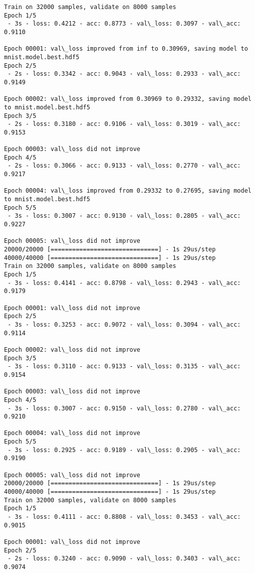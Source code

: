 \documentclass[11pt]{article}
\begin{document}
    \begin{Verbatim}[commandchars=\\\{\}]
Train on 32000 samples, validate on 8000 samples
Epoch 1/5
 - 3s - loss: 0.4212 - acc: 0.8773 - val\_loss: 0.3097 - val\_acc: 0.9110

Epoch 00001: val\_loss improved from inf to 0.30969, saving model to mnist.model.best.hdf5
Epoch 2/5
 - 2s - loss: 0.3342 - acc: 0.9043 - val\_loss: 0.2933 - val\_acc: 0.9149

Epoch 00002: val\_loss improved from 0.30969 to 0.29332, saving model to mnist.model.best.hdf5
Epoch 3/5
 - 2s - loss: 0.3180 - acc: 0.9106 - val\_loss: 0.3019 - val\_acc: 0.9153

Epoch 00003: val\_loss did not improve
Epoch 4/5
 - 2s - loss: 0.3066 - acc: 0.9133 - val\_loss: 0.2770 - val\_acc: 0.9217

Epoch 00004: val\_loss improved from 0.29332 to 0.27695, saving model to mnist.model.best.hdf5
Epoch 5/5
 - 3s - loss: 0.3007 - acc: 0.9130 - val\_loss: 0.2805 - val\_acc: 0.9227

Epoch 00005: val\_loss did not improve
20000/20000 [==============================] - 1s 29us/step
40000/40000 [==============================] - 1s 29us/step
Train on 32000 samples, validate on 8000 samples
Epoch 1/5
 - 3s - loss: 0.4141 - acc: 0.8798 - val\_loss: 0.2943 - val\_acc: 0.9179

Epoch 00001: val\_loss did not improve
Epoch 2/5
 - 3s - loss: 0.3253 - acc: 0.9072 - val\_loss: 0.3094 - val\_acc: 0.9114

Epoch 00002: val\_loss did not improve
Epoch 3/5
 - 3s - loss: 0.3110 - acc: 0.9133 - val\_loss: 0.3135 - val\_acc: 0.9154

Epoch 00003: val\_loss did not improve
Epoch 4/5
 - 3s - loss: 0.3007 - acc: 0.9150 - val\_loss: 0.2780 - val\_acc: 0.9210

Epoch 00004: val\_loss did not improve
Epoch 5/5
 - 3s - loss: 0.2925 - acc: 0.9189 - val\_loss: 0.2905 - val\_acc: 0.9190

Epoch 00005: val\_loss did not improve
20000/20000 [==============================] - 1s 29us/step
40000/40000 [==============================] - 1s 29us/step
Train on 32000 samples, validate on 8000 samples
Epoch 1/5
 - 3s - loss: 0.4111 - acc: 0.8808 - val\_loss: 0.3453 - val\_acc: 0.9015

Epoch 00001: val\_loss did not improve
Epoch 2/5
 - 2s - loss: 0.3240 - acc: 0.9090 - val\_loss: 0.3403 - val\_acc: 0.9074


\end{Verbatim}
\end{document}
